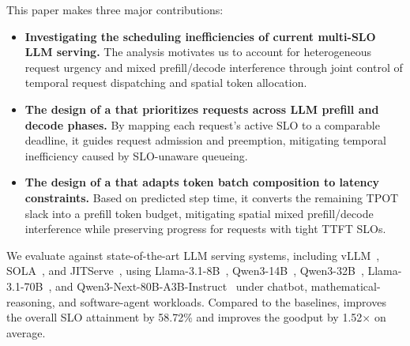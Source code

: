 This paper makes three major contributions:
\begin{itemize}
  \item \textbf{Investigating the scheduling inefficiencies of current multi-SLO LLM serving.}
  The analysis motivates us to account for heterogeneous request urgency and mixed prefill/decode interference through joint control of temporal request dispatching and spatial token allocation.

  \item \textbf{The design of a \dispatcher{} that prioritizes requests across LLM prefill and decode phases.}
  By mapping each request's active SLO to a comparable deadline, it guides request admission and preemption, mitigating temporal inefficiency caused by SLO-unaware queueing.

  \item \textbf{The design of a \allocator{} that adapts token batch composition to latency constraints.}
  Based on predicted step time, it converts the remaining TPOT slack into a prefill token budget, mitigating spatial mixed prefill/decode interference while preserving progress for requests with tight TTFT SLOs.
\end{itemize}


We evaluate \tango{} against state-of-the-art LLM serving systems, including vLLM~\cite{kwon2023vllm}, SOLA~\cite{hong2025sola}, and JITServe~\cite{zhang2026jitserve}, using Llama-3.1-8B~\cite{grattafiori2024llama3}, Qwen3-14B~\cite{yang2025qwen3}, Qwen3-32B~\cite{yang2025qwen3}, Llama-3.1-70B~\cite{grattafiori2024llama3}, and Qwen3-Next-80B-A3B-Instruct~\cite{qwen2025next} under chatbot, mathematical-reasoning, and software-agent workloads.
Compared to the baselines, \tango{} improves the overall SLO attainment by 58.72\% and improves the goodput by 1.52$\times$ on average.

